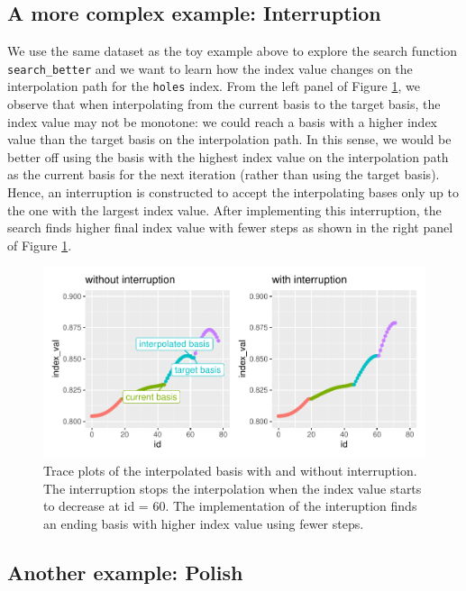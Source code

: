 \documentclass[12pt]{article}
\begin{document}
\hypertarget{a-more-complex-example-interruption}{%
\subsection{A more complex example:
Interruption}\label{a-more-complex-example-interruption}}

We use the same dataset as the toy example above to explore the search
function \texttt{search\_better} and we want to learn how the index
value changes on the interpolation path for the \texttt{holes} index.
From the left panel of Figure \ref{interruption}, we observe that when
interpolating from the current basis to the target basis, the index
value may not be monotone: we could reach a basis with a higher index
value than the target basis on the interpolation path. In this sense, we
would be better off using the basis with the highest index value on the
interpolation path as the current basis for the next iteration (rather
than using the target basis). Hence, an interruption is constructed to
accept the interpolating bases only up to the one with the largest index
value. After implementing this interruption, the search finds higher
final index value with fewer steps as shown in the right panel of Figure
\ref{interruption}.

\begin{figure}
\centering
\includegraphics{paper_files/figure-latex/interruption-1.pdf}
\caption{\label{interruption}Trace plots of the interpolated basis with
and without interruption. The interruption stops the interpolation when
the index value starts to decrease at id = 60. The implementation of the
interuption finds an ending basis with higher index value using fewer
steps.}
\end{figure}

\hypertarget{another-example-polish}{%
\subsection{Another example: Polish}\label{another-example-polish}}
\end{document}
